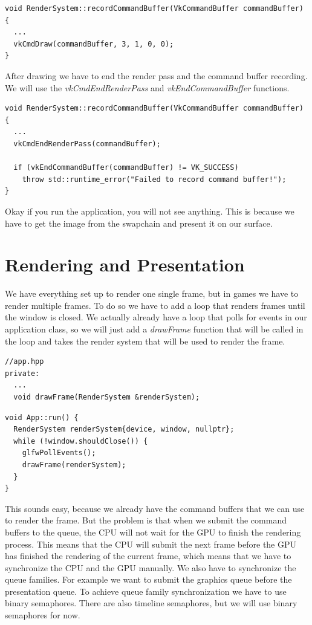 \documentclass[12pt]{report} \usepackage{preamble}
\begin{document}
\begin{lstlisting}[Language=C++]
void RenderSystem::recordCommandBuffer(VkCommandBuffer commandBuffer) {
  ...
  vkCmdDraw(commandBuffer, 3, 1, 0, 0);
}
\end{lstlisting}

After drawing we have to end the render pass and the command buffer recording. We will use the \textit{vkCmdEndRenderPass} and
\textit{vkEndCommandBuffer} functions.

\begin{lstlisting}[Language=C++]
void RenderSystem::recordCommandBuffer(VkCommandBuffer commandBuffer) {
  ...
  vkCmdEndRenderPass(commandBuffer);

  if (vkEndCommandBuffer(commandBuffer) != VK_SUCCESS)
    throw std::runtime_error("Failed to record command buffer!");
}
\end{lstlisting}

Okay if you run the application, you will not see anything. This is because we have to get the image from the swapchain and
present it on our surface.

\section{Rendering and Presentation}

We have everything set up to render one single frame, but in games we have to render multiple frames. To do so we have to
add a loop that renders frames until the window is closed. We actually already have a loop that polls for events in our
application class, so we will just add a \textit{drawFrame} function that will be called in the loop and takes the
render system that will be used to render the frame.

\begin{lstlisting}[Language=C++]
//app.hpp
private:
  ...
  void drawFrame(RenderSystem &renderSystem);
\end{lstlisting}

\begin{lstlisting}[Language=C++]
void App::run() {
  RenderSystem renderSystem{device, window, nullptr};
  while (!window.shouldClose()) {
    glfwPollEvents();
    drawFrame(renderSystem);
  }
}
\end{lstlisting}

This sounds easy, because we already have the command buffers that we can use to render the frame. But the problem is that
when we submit the command buffers to the queue, the CPU will not wait for the GPU to finish the rendering process. This means that
the CPU will submit the next frame before the GPU has finished the rendering of the current frame, which means that we have
to synchronize the CPU and the GPU manually. We also have to synchronize the queue families. For example we want to submit the
graphics queue before the presentation queue. To achieve queue family synchronization we have to use binary semaphores. There are
also timeline semaphores, but we will use binary semaphores for now.
\end{document}
